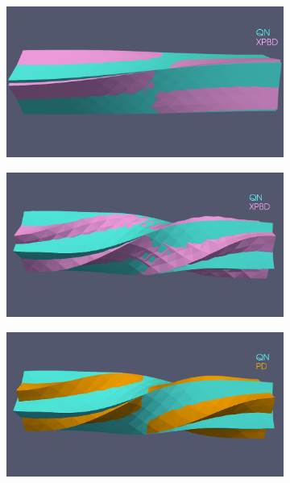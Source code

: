 \begin{figure}
    \centering
    \begin{subfigure}{0.49\textwidth}
        \includegraphics[width=\textwidth, trim={0 5.0cm 0 2.5cm}, clip]{figures/strain_beam_untwist_QN_vs_XPBD.png}
    \end{subfigure}
    \hspace{0.001\textwidth}
    \begin{subfigure}{0.49\textwidth}
        \includegraphics[width=\textwidth, trim={0 4.5cm 0 2.15cm}, clip]{figures/strain_beam_untwist_QN_vs_XPBD_10_iterations.png}
    \end{subfigure}
    \par\medskip
    \begin{subfigure}{0.49\textwidth}
        \includegraphics[width=\textwidth, trim={0 4.5cm 0 2.15cm}, clip]{figures/strain_beam_untwist_QN_vs_PD_10_iterations.png}

\end{subfigure}
\end{figure}
